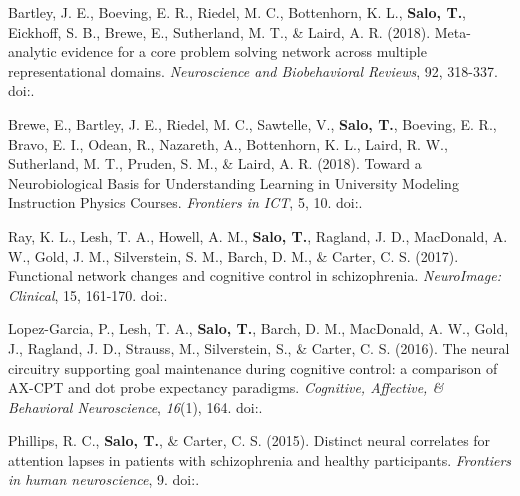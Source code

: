 \documentclass[10pt]{article}
\newcommand{\textlink}[3][blue]{\href{#2}{\color{#1}{#3}}}
\begin{document}
\begin{hangparas}{.25in}{1}
	\bigskip

	Bartley, J. E., Boeving, E. R., Riedel, M. C., Bottenhorn, K. L.,
	\textbf{Salo, T.}, Eickhoff, S. B., Brewe, E., Sutherland, M. T.,
	\& Laird, A. R. (2018).
	Meta-analytic evidence for a core problem solving network across multiple
	representational domains. \emph{Neuroscience and Biobehavioral Reviews}, 92, 318-337.
	doi:\textlink{https://doi.org/10.1016/j.neubiorev.2018.06.009}{10.1016/j.neubiorev.2018.06.009}.

	\bigskip

	Brewe, E., Bartley, J. E., Riedel, M. C., Sawtelle, V., \textbf{Salo, T.},
	Boeving, E. R., Bravo, E. I., Odean, R., Nazareth, A., Bottenhorn, K. L.,
	Laird, R. W., Sutherland, M. T., Pruden, S. M., \& Laird, A. R. (2018).
	Toward a Neurobiological Basis for Understanding Learning in University Modeling
	Instruction Physics Courses. \emph{Frontiers in ICT}, 5, 10.
	doi:\textlink{https://doi.org/10.3389/fict.2018.00010}{10.3389/fict.2018.00010}.

	\bigskip

	Ray, K. L., Lesh, T. A., Howell, A. M., \textbf{Salo, T.}, Ragland, J. D.,
	MacDonald, A. W., Gold, J. M., Silverstein, S. M., Barch, D. M., \& Carter,
	C. S. (2017). Functional network changes and cognitive control in schizophrenia.
	\emph{NeuroImage: Clinical}, 15, 161-170.
	doi:\textlink{https://doi.org/10.1016/j.nicl.2017.05.001}{10.1016/j.nicl.2017.05.001}.

	\bigskip

	Lopez-Garcia, P., Lesh, T. A., \textbf{Salo, T.}, Barch, D. M., MacDonald,
	A. W., Gold, J., Ragland, J. D., Strauss, M., Silverstein, S., \& Carter, C. S.
	(2016). The neural circuitry supporting goal maintenance during cognitive
	control: a comparison of AX-CPT and dot probe expectancy paradigms.
	\emph{Cognitive, Affective, \& Behavioral Neuroscience}, \emph{16}(1), 164.
	doi:\textlink{https://doi.org/10.3758/s13415-015-0384-1}{10.3758/s13415-015-0384-1}.

	\bigskip

	Phillips, R. C., \textbf{Salo, T.}, \& Carter, C. S. (2015). Distinct neural
	correlates for attention lapses in patients with schizophrenia and healthy
	participants. \emph{Frontiers in human neuroscience}, 9.
	doi:\textlink{https://doi.org/10.3389/fnhum.2015.00502}{10.3389/fnhum.2015.00502}.

\end{hangparas}

\bigskip
\end{document}
